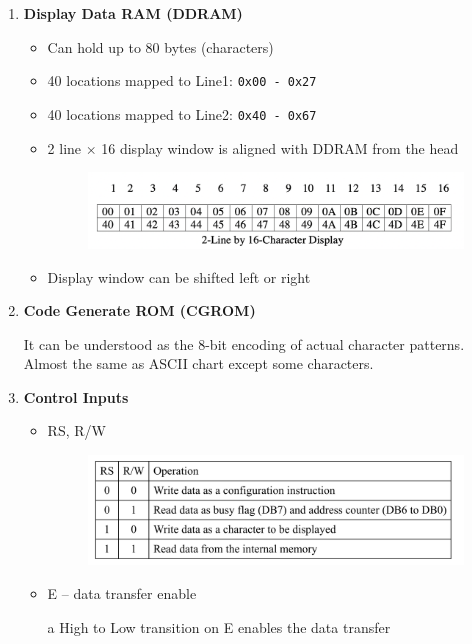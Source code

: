 \documentclass[a4paper]{article}
\begin{document}
\begin{enumerate}[label = \arabic*.]
    \item \textbf{Display Data RAM (DDRAM)}
      \begin{itemize}[leftmargin = 1cm]
        \item Can hold up to 80 bytes (characters)
        \item 40 locations mapped to Line1: \verb|0x00 - 0x27|
        \item 40 locations mapped to Line2: \verb|0x40 - 0x67|
        \item 2 line \( \times \) 16 display window is aligned with DDRAM from the head
          \begin{figure}[H]
            \centering
            \includegraphics[width=0.6\linewidth]{Display_window.png}
            \label{fig:Display_window.png}
          \end{figure}
        \item Display window can be shifted left or right
      \end{itemize}

    \item \textbf{Code Generate ROM (CGROM)}
      \par It can be understood as the 8-bit encoding of actual character patterns. Almost the same as ASCII chart except some characters.

    \item \textbf{Control Inputs}
      \begin{itemize}[leftmargin = 1cm]
        \item RS, R/W
          \begin{figure}[H]
            \centering
            \includegraphics[width=0.6\linewidth]{RS_RW_definition.jpeg}
            \label{fig:RS_RW_definition.jpeg}
          \end{figure}
        \item E -- data transfer enable
          \par a High to Low transition on E enables the data transfer
      \end{itemize}


\end{enumerate}
\end{document}
